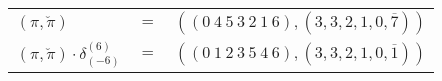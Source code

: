 \begin{example}\label{example:OHVZBOMX}
  \hfill \break
  \begin{tabular}{lll}
    $(\pi,\breve\pi)$ & $=$ & $(({0}~{4}~{5}~{3}~{2}~{1}~{6}),(3,3,2,1,0,\overline{7}))$ \\
    $(\pi,\breve\pi) \cdot \delta^{(6)}_{(-6)}$ & $=$ & $(({0}~{1}~{2}~{3}~{5}~{4}~{6}),(3,3,2,1,0,\overline{1}))$ \\
  \end{tabular}
\end{example}